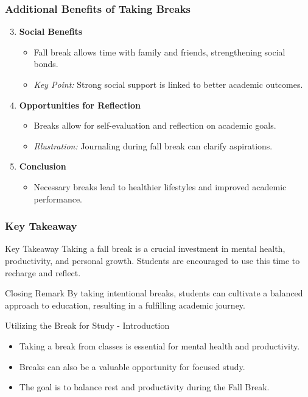 \documentclass[aspectratio=169]{beamer}
\begin{document}
\begin{frame}[fragile]
    \frametitle{Additional Benefits of Taking Breaks}
    \begin{enumerate}
        \setcounter{enumi}{2}
        \item \textbf{Social Benefits}
        \begin{itemize}
            \item Fall break allows time with family and friends, strengthening social bonds.
            \item \textit{Key Point:} Strong social support is linked to better academic outcomes.
        \end{itemize}
        \item \textbf{Opportunities for Reflection}
        \begin{itemize}
            \item Breaks allow for self-evaluation and reflection on academic goals.
            \item \textit{Illustration:} Journaling during fall break can clarify aspirations.
        \end{itemize}
        \item \textbf{Conclusion}
        \begin{itemize}
            \item Necessary breaks lead to healthier lifestyles and improved academic performance.
        \end{itemize}
    \end{enumerate}
\end{frame}

\begin{frame}[fragile]
    \frametitle{Key Takeaway}
    \begin{block}{Key Takeaway}
        Taking a fall break is a crucial investment in mental health, productivity, and personal growth. 
        Students are encouraged to use this time to recharge and reflect.
    \end{block}
    \begin{block}{Closing Remark}
        By taking intentional breaks, students can cultivate a balanced approach to education, resulting in a fulfilling academic journey.
    \end{block}
\end{frame}

\begin{frame}[fragile]{Utilizing the Break for Study - Introduction}
  \begin{itemize}
    \item Taking a break from classes is essential for mental health and productivity.
    \item Breaks can also be a valuable opportunity for focused study.
    \item The goal is to balance rest and productivity during the Fall Break.
  \end{itemize}
\end{frame}
\end{document}
